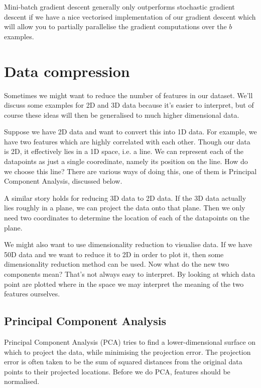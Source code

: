 \documentclass[a4paper, 10pt,hidelinks]{article}
\begin{document}

Mini-batch gradient descent generally only outperforms stochastic gradient descent if we have a nice vectorised implementation of our gradient descent which will allow you to partially parallelise the gradient computations over the $b$ examples. 

\section{Data compression}
Sometimes we might want to reduce the number of features in our dataset. We'll discuss some examples for 2D and 3D data because it's easier to interpret, but of course these ideas will then be generalised to much higher dimensional data. 

Suppose we have 2D data and want to convert this into 1D data. For example, we have two features which are highly correlated with each other. Though our data is 2D, it effectively lies in a 1D space, i.e. a line. We can represent each of the datapoints as just a single cooredinate, namely its position on the line. How do we choose this line? There are various ways of doing this, one of them is Principal Component Analysis, discussed below. 

A similar story holds for reducing 3D data to 2D data. If the 3D data actually lies roughly in a plane, we can project the data onto that plane. Then we only need two coordinates to determine the location of each of the datapoints on the plane. 


We might also want to use dimensionality reduction to visualise data. If we have 50D data and we want to reduce it to 2D in order to plot it, then some dimensionality reduction method can be used. Now what do the new two components mean? That's not always easy to interpret. By looking at which data point are plotted where in the space we may interpret the meaning of the two features ourselves. 

\subsection{Principal Component Analysis}
Principal Component Analysis (PCA) tries to find a lower-dimensional surface on which to project the data, while minimising the projection error. The projection error is often taken to be the sum of squared distances from the original data points to their projected locations. Before we do PCA, features should be normalised. 
\end{document}

